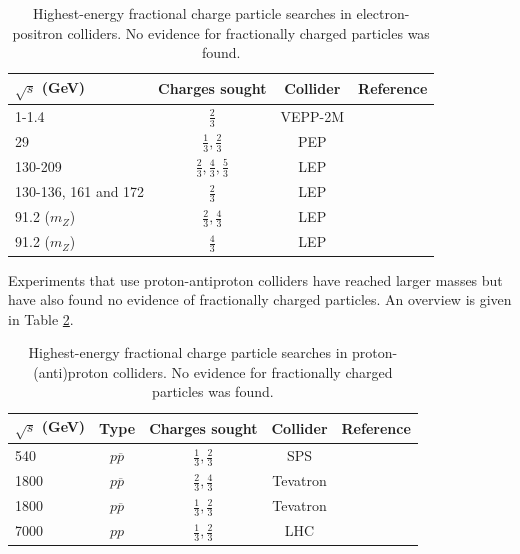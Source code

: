 \begin{table}[]
\caption{Highest-energy fractional charge particle searches in electron-positron colliders. No evidence for fractionally charged particles was found.}
\label{tab:elecposcollider}
\centering
\begin{tabular}{|l|c|c|c|}
\hline
\rowcolor[HTML]{F1A91E} 
\textbf{$\sqrt{s}$ (GeV)} & \textbf{Charges sought}                        & \textbf{Collider} &\textbf{Reference}\\ \hline
1-1.4		 & $\frac{2}{3}$						 & VEPP-2M  & \cite{Bondar:1985sb} \\ \hline
29			 & $\frac{1}{3},\frac{2}{3}$			 & PEP & \cite{Aihara:1984px} \\ \hline		
130-209      & $\frac{2}{3},\frac{4}{3},\frac{5}{3}$ & LEP & \cite{Abbiendi:2003yd}    \\ \hline
130-136, 161 and 172 & $\frac{2}{3}$                 & LEP & \cite{Abreu:1996py}    \\ \hline
91.2 ($m_Z$) & $\frac{2}{3},\frac{4}{3}$             & LEP & \cite{Akers:1995az}    \\ \hline
91.2 ($m_Z$) & $\frac{4}{3}$   	    			     & LEP & \cite{Buskulic:1992mr}  \\ \hline
\end{tabular}
\end{table}

Experiments that use proton-antiproton colliders have reached larger masses but have also found no evidence of fractionally charged particles. An overview is given in Table \ref{tab:protonantiprotoncollider}.


\begin{table}[]
\caption{Highest-energy fractional charge particle searches in proton-(anti)proton colliders. No evidence for fractionally charged particles was found.}
\label{tab:protonantiprotoncollider}
\centering
\begin{tabular}{|l|c|c|c|c|}
\hline
\rowcolor[HTML]{F1A91E} 
\textbf{$\sqrt{s}$ (GeV)} & \textbf{Type} & \textbf{Charges sought}            & \textbf{Collider} & \textbf{Reference} \\ \hline
540		 & $p\overline{p}$ & $\frac{1}{3},\frac{2}{3}$ & SPS      & \cite{Banner:1985ev} \\ \hline
1800          & $p\overline{p}$ & $\frac{2}{3},\frac{4}{3}$ & Tevatron & \cite{Abe:1992vr}         \\ \hline
1800          & $p\overline{p}$ & $\frac{1}{3},\frac{2}{3}$ & Tevatron & \cite{Acosta:2002ju} \\ \hline
7000          & $pp$ & $\frac{1}{3},\frac{2}{3}$ & LHC & \cite{CMS:2012xi} \\ \hline

\end{tabular}
\end{table}

